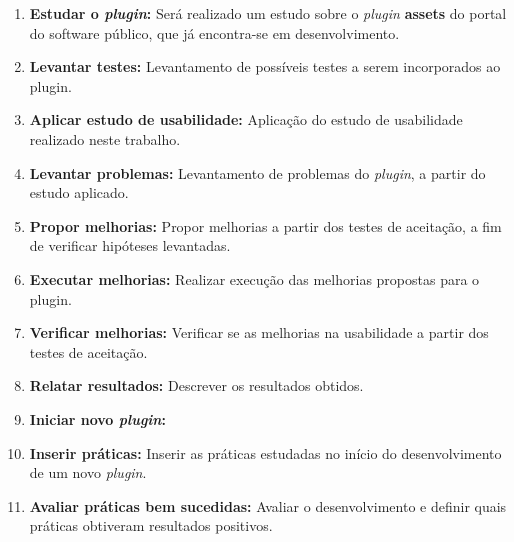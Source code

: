 \begin{enumerate}
\item \textbf{Estudar o \textit{plugin}:} Será realizado um estudo sobre o \textit{plugin} \textbf{assets} do portal do software público, que já encontra-se em desenvolvimento.
\item \textbf{Levantar testes:} Levantamento de possíveis testes a serem incorporados ao plugin.
\item \textbf{Aplicar estudo de usabilidade:} Aplicação do estudo de usabilidade realizado neste trabalho.
\item \textbf{Levantar problemas:} Levantamento de problemas do \textit{plugin}, a partir do estudo aplicado.
\item  \textbf{Propor melhorias:} Propor melhorias a partir dos testes de aceitação, a fim de verificar hipóteses levantadas.
\item \textbf{Executar melhorias:} Realizar execução das melhorias propostas para o plugin.
\item \textbf{Verificar melhorias:} Verificar se as melhorias na usabilidade a partir dos testes de aceitação.
\item \textbf{Relatar resultados:} Descrever os resultados obtidos.
\item \textbf{Iniciar novo \textit{plugin}:} 
\item \textbf{Inserir práticas:} Inserir as práticas estudadas no início do desenvolvimento de um novo \textit{plugin}.
\item \textbf{Avaliar práticas bem sucedidas:} Avaliar o desenvolvimento e definir quais práticas obtiveram resultados positivos.

\end{enumerate}


